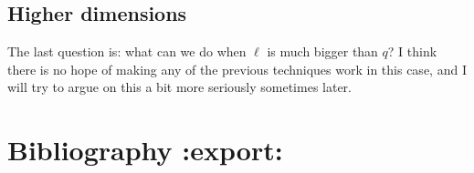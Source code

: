 \documentclass[11pt]{article}
\begin{document}
\subsection{Higher dimensions}
    
The last question is: what can we do when $\ell$ is much bigger than
$q$? I think there is no hope of making any of the previous techniques
work in this case, and I will try to argue on this a bit more
seriously sometimes later.


\section{Bibliography \textbf{:export:}}

\printbibliography
\end{document}
